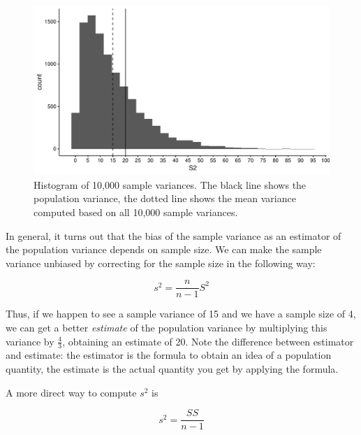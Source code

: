 \documentclass[]{book}\usepackage[]{graphicx}\usepackage[]{color}
\makeatletter
\def\maxwidth{ %
  \ifdim\Gin@nat@width>\linewidth
    \linewidth
  \else
    \Gin@nat@width
  \fi
}
\newenvironment{knitrout}{}{} %
\makeatother
\begin{document}
\begin{knitrout}
\color{fgcolor}\begin{figure}

{\centering \includegraphics[width=\maxwidth]{figure/sample_variance_-1} 

}

\caption[Histogram of 10,000 sample variances]{Histogram of 10,000 sample variances. The black line shows the population variance, the dotted line shows the mean variance computed based on all 10,000 sample variances.}\label{fig:sample_variance,}
\end{figure}


\end{knitrout}

In general, it turns out that the bias of the sample variance as an estimator of the population variance depends on sample size. We can make the sample variance unbiased by correcting for the sample size in the following way:

\begin{equation}
s^2 = \frac{n}{n-1}S^2
\end{equation}

Thus, if we happen to see a sample variance of 15 and we have a sample size of 4, we can get a better \textit{estimate} of the population variance by multiplying this variance by $\frac{4}{3}$, obtaining an estimate of 20. Note the difference between estimator and estimate: the estimator is the formula to obtain an idea of a population quantity, the estimate is the actual quantity you get by applying the formula.

A more direct way to compute $s^2$ is

\begin{equation}
s^2 = \frac{SS}{n-1}
\end{equation}
\end{document}
